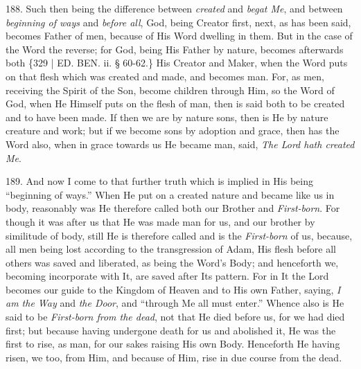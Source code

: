 188. Such then being the
difference between \emph{created} and \emph{begat Me}, and between \emph{beginning
of ways} and \emph{before all}, God, being Creator first, next, as
has been said, becomes Father of men, because of His Word dwelling in
them. But in the case of the Word the reverse; for God, being His
Father by nature, becomes afterwards both \{329 | ED.
BEN. ii. § 60-62.\} His Creator and Maker, when
the Word puts on that flesh which was created and made, and becomes
man. For, as men, receiving the Spirit of the Son, become children
through Him, so the Word of God, when He Himself puts on the flesh of
man, then is said both to be created and to have been made. If then we
are by nature sons, then is He by nature creature and work; but if we
become sons by adoption and grace, then has the Word also, when in
grace towards us He became man, said, \emph{The Lord hath created Me}.

189. And now I come to that
further truth which is implied in His being ``beginning of ways.'' When
He put on a created nature and became like us in body, reasonably was
He therefore called both our Brother and \emph{First-born}. For though
it was after us that He was made man for us, and our brother by
similitude of body, still He is therefore called and is the \emph{First-born}
of us, because, all men being lost according to the transgression of
Adam, His flesh before all others was saved and liberated, as being
the Word's Body; and henceforth we, becoming incorporate with It, are
saved after Its pattern. For in It the Lord becomes our guide to the
Kingdom of Heaven and to His own Father, saying, \emph{I am the Way}
and \emph{the Door}, and ``through Me all must enter.'' Whence also is
He said to be \emph{First-born from the dead}, not that He died before
us, for we had died first; but because having undergone death for us
and abolished it, He was the first to rise, as man, for our sakes
raising His own Body. Henceforth He having risen, we too, from Him,
and because of Him, rise in due course from the dead.

